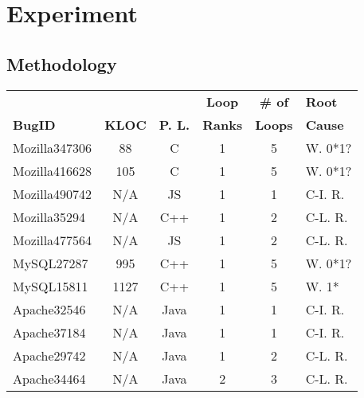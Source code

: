 \section{Experiment}
\label{sec:experiment}

\subsection{Methodology}


\begin{table}
  \centering
  \small
  \newcommand{\Yes}[1]{\checkmark{}$_#1$}
  \newcommand{\No}[0]{-}
  \begin{tabular}{lccccl}
    \toprule
                    &      	   &                        &{\bf Loop }  &  {\bf  \# of}   & {\bf Root}  \\
   {\bf BugID}      &  {\bf KLOC}  &  {\bf P. L.}           &{\bf Ranks}  &  {\bf  Loops}   & {\bf Cause} \\
   \midrule
   Mozilla347306    & 88           & C                      & 1               & 5               &  W. 0*1?     \\
   Mozilla416628    & 105          & C                      & 1               & 5               &  W. 0*1?     \\
   Mozilla490742    & N/A          & JS                     & 1               & 1               &  C-I. R.       \\
   Mozilla35294     & N/A          & C++                    & 1               & 2               &  C-L. R.        \\ 
   Mozilla477564    & N/A          & JS                     & 1               & 2               &  C-L. R.       \\
   \midrule 
   MySQL27287       & 995          & C++                    & 1               & 5               &  W. 0*1?     \\
   MySQL15811       & 1127         & C++                    & 1               & 5               &  W. 1* \\ 
   \midrule    
   Apache32546      & N/A          & Java                   & 1               & 1               &  C-I. R.  \\
   Apache37184      & N/A          & Java                   & 1               & 1               &  C-I. R.  \\
   Apache29742      & N/A          & Java                   & 1               & 2               &  C-L. R. \\ 
   Apache34464      & N/A          & Java                   & 2               & 3               &  C-L. R.  \\

\end{tabular}
\end{table}
